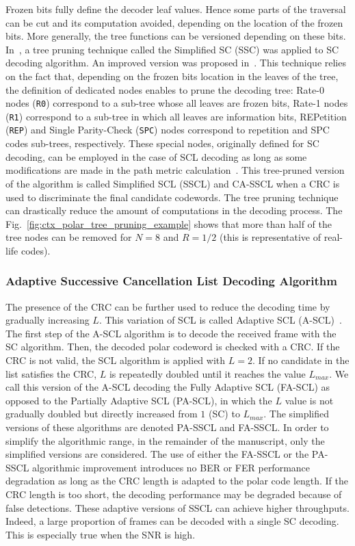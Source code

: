 Frozen bits fully define the decoder leaf values. Hence some parts of the
traversal can be cut and its computation avoided, depending on the location of
the frozen bits. More generally, the tree functions can be versioned depending
on these bits. In~\cite{Alamdar-Yazdi2011}, a tree pruning technique called the
Simplified SC (SSC) was applied to SC decoding algorithm. An improved version
was proposed in~\cite{Sarkis2014a}. This technique relies on the fact that,
depending on the frozen bits location in the leaves of the tree, the definition
of dedicated nodes enables to prune the decoding tree: Rate-0 nodes (\verb|R0|)
correspond to a sub-tree whose all leaves are frozen bits, Rate-1 nodes
(\verb|R1|) correspond to a sub-tree in which all leaves are information bits,
REPetition (\verb|REP|) and Single Parity-Check (\verb|SPC|) nodes correspond to
repetition and SPC codes sub-trees, respectively. These special nodes,
originally defined for SC decoding, can be employed in the case of SCL decoding
as long as some modifications are made in the path metric
calculation~\cite{Sarkis2016}. This tree-pruned version of the algorithm is
called Simplified SCL (SSCL) and CA-SSCL when a CRC is used to discriminate
the final candidate codewords. The tree pruning technique can drastically reduce
the amount of computations in the decoding process. The
Fig.~\ref{fig:ctx_polar_tree_pruning_example} shows that more than half of the
tree nodes can be removed for $N = 8$ and $R = 1 / 2$ (this is representative of
real-life codes).

\subsubsection{Adaptive Successive Cancellation List Decoding Algorithm}
\label{sec:ctx_polar_ascl}

The presence of the CRC can be further used to reduce the decoding time by
gradually increasing $L$. This variation of SCL is called Adaptive SCL
(A-SCL)~\cite{Li2012}. The first step of the A-SCL algorithm is to decode the
received frame with the SC algorithm. Then, the decoded polar codeword is
checked with a CRC. If the CRC is not valid, the SCL algorithm is applied with
$L=2$. If no candidate in the list satisfies the CRC, $L$ is repeatedly doubled
until it reaches the value $L_{max}$. We call this version of the A-SCL decoding
the Fully Adaptive SCL (FA-SCL) as opposed to the Partially Adaptive SCL
(PA-SCL), in which the $L$ value is not gradually doubled but directly increased
from $1$ (SC) to $L_{max}$. The simplified versions of these algorithms are
denoted PA-SSCL and FA-SSCL. In order to simplify the algorithmic range, in the
remainder of the manuscript, only the simplified versions are considered. The
use of either the FA-SSCL or the PA-SSCL algorithmic improvement introduces no
BER or FER performance degradation as long as the CRC length is adapted to the
polar code length. If the CRC length is too short, the decoding performance may
be degraded because of false detections. These adaptive versions of SSCL can
achieve higher throughputs. Indeed, a large proportion of frames can be decoded
with a single SC decoding. This is especially true when the SNR is high.


